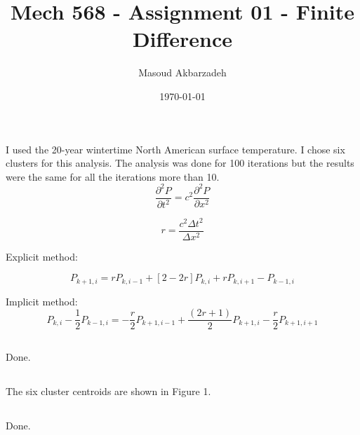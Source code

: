 \documentclass[12pt]{article}
\begin{document}
\title{Mech 568 - Assignment 01 - Finite Difference}
\author{Masoud Akbarzadeh}
\date{\today}


\maketitle


\section{}\label{sec:problem-1}

\subsection{}\label{subsec:problem-1-a}
I used the 20-year wintertime North American surface temperature.
I chose six clusters for this analysis.
The analysis was done for 100 iterations but the results were the same for all the iterations more than 10.
\[ \frac{\partial^2 P}{\partial t^2} = c^2 \frac{\partial^2 P}{\partial x^2}  \]

\[ r = \frac{c^2 \Delta t^2}{\Delta x^2}   \]

Explicit method:

\[ P_{k+1,i} = r P_{k,i-1} + [2-2r] P_{k,i} + r P_{k,i+1} - P_{k-1,i}  \]

Implicit method:
\[ P_{k,i} - \frac{1}{2} P_{k-1,i} = -\frac{r}{2} P_{k+1,i-1} + \frac{(2r+1)}{2} P_{k+1,i} - \frac{r}{2} P_{k+1,i+1} \]


\subsection{}\label{subsec:problem-1-b}
Done.
\subsection{}\label{subsec:problem-1-c}
The six cluster centroids are shown in Figure 1.

\subsection{}\label{subsec:problem-1-d}
Done.
\subsection{}\label{subsec:problem-1-e}
\end{document}
